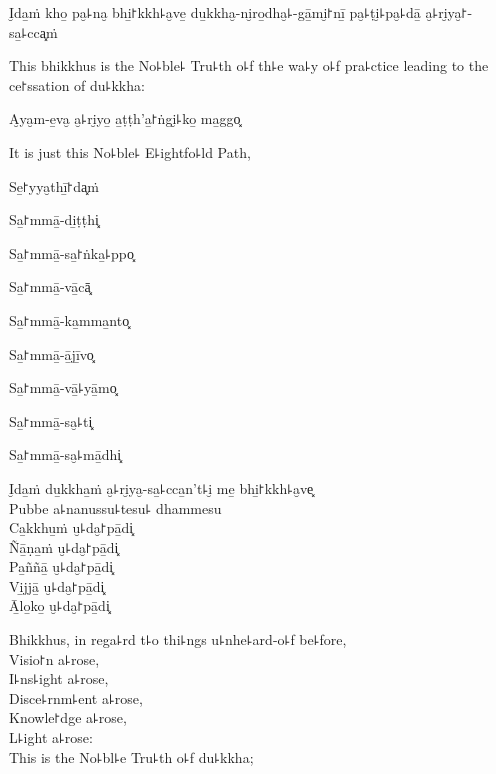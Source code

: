 \ifaivedition
\clearpage
\fi

I̮da̱ṁ kho̱ pa̮꜕na̮ bhi̱꜓kkh꜕a̮ve̱ du̱kkha̮-ni̮ro̱dha̮꜕-gā̱mi̮꜓nī̱ pa̮꜕ṭi̮꜕pa̮꜕dā̱ a̮꜕ri̮ya̮꜓-sa̱꜕cca͓ṁ

\begin{english}
  This bhikkhus is the No꜕ble꜕ Tru꜕th o꜕f th꜕e wa꜕y o꜕f pra꜕ctice leading to the ce꜓ssation of du꜕kkha:
\end{english}

A̮ya̮m-e̱va̮ a̮꜕ri̮yo̱ a̱ṭṭh'a̱꜓ṅgi̮꜕ko̱ ma̱ggo͓

\begin{english}
  It is just this No꜕ble꜕ E꜕ightfo꜕ld Path,
\end{english}

Se̱꜓yya̮thī̱꜓da͓ṁ


Sa̱꜓mmā̱-di̱ṭṭhi͓


Sa̱꜓mmā̱-sa̱꜓ṅka̱꜕ppo͓


Sa̱꜓mmā̱-vā̱cā͓


Sa̱꜓mmā̱-ka̱mma̱nto͓


Sa̱꜓mmā̱-ā̱jī̱vo͓


Sa̱꜓mmā̱-vā̱꜕yā̱mo͓


Sa̱꜓mmā̱-sa̮꜕ti͓


Sa̱꜓mmā̱-sa̮꜕mā̱dhi͓


I̮da̱ṁ du̱kkha̱ṁ a̮꜕ri̮ya̮-sa̱꜕cca̱n't꜕i̮ me̱ bhi̱꜓kkh꜕a̮ve͓\\
Pubbe a꜕nanussu꜕tesu꜕ dhammesu\\
Ca̱kkhu̱ṁ u̮꜕da̮꜓pā̱di͓\\
Ñā̱ṇa̱ṁ u̮꜕da̮꜓pā̱di͓\\
Pa̱ññā̱ u̮꜕da̮꜓pā̱di͓\\
Vi̱jjā̱ u̮꜕da̮꜓pā̱di͓\\
Ā̱lo̱ko̱ u̮꜕da̮꜓pā̱di͓

\begin{english}
  Bhikkhus, in rega꜕rd t꜕o thi꜕ngs u꜕nhe꜕ard-o꜕f be꜕fore,\\
  Visio꜓n a꜕rose,\\
  I꜕ns꜕ight a꜕rose,\\
  Disce꜕rnm꜕ent a꜕rose,\\
  Knowle꜓dge a꜕rose,\\
  L꜕ight a꜕rose:\\
  This is the No꜕bl꜕e Tru꜕th o꜕f du꜕kkha;
\end{english}

